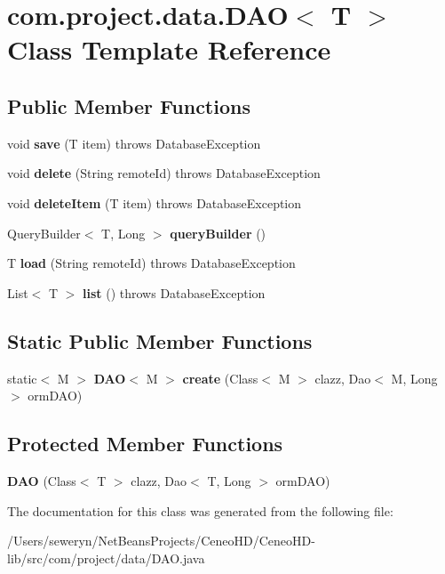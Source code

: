 \section{com.\+project.\+data.\+D\+AO$<$ T $>$ Class Template Reference}
\label{classcom_1_1project_1_1data_1_1_d_a_o}
\subsection*{Public Member Functions}
\begin{DoxyCompactItemize}
\item 
\mbox{\label{classcom_1_1project_1_1data_1_1_d_a_o_aff1d31a3d9bf4eab852e520af7682f20}} 
void {\bfseries save} (T item)  throws Database\+Exception 
\item 
\mbox{\label{classcom_1_1project_1_1data_1_1_d_a_o_a7c169df6492e909666f3c0544a2e9cc6}} 
void {\bfseries delete} (String remote\+Id)  throws Database\+Exception 
\item 
\mbox{\label{classcom_1_1project_1_1data_1_1_d_a_o_aa1ec1c6cc8b7a7126b2a6e049c9f3e17}} 
void {\bfseries delete\+Item} (T item)  throws Database\+Exception 
\item 
\mbox{\label{classcom_1_1project_1_1data_1_1_d_a_o_ae804c557084e909940631da1a77403c6}} 
Query\+Builder$<$ T, Long $>$ {\bfseries query\+Builder} ()
\item 
\mbox{\label{classcom_1_1project_1_1data_1_1_d_a_o_a30552a04b7b971e0e7666c5e4553d1be}} 
T {\bfseries load} (String remote\+Id)  throws Database\+Exception
\item 
\mbox{\label{classcom_1_1project_1_1data_1_1_d_a_o_a38741fef5f4ec613a27a4b3efe9760e4}} 
List$<$ T $>$ {\bfseries list} ()  throws Database\+Exception
\end{DoxyCompactItemize}
\subsection*{Static Public Member Functions}
\begin{DoxyCompactItemize}
\item 
\mbox{\label{classcom_1_1project_1_1data_1_1_d_a_o_a2fe12a0cce05ab5a2db64f63ca726cc7}} 
static$<$ M $>$ \textbf{ D\+AO}$<$ M $>$ {\bfseries create} (Class$<$ M $>$ clazz, Dao$<$ M, Long $>$ orm\+D\+AO)
\end{DoxyCompactItemize}
\subsection*{Protected Member Functions}
\begin{DoxyCompactItemize}
\item 
\mbox{\label{classcom_1_1project_1_1data_1_1_d_a_o_a4e4cac87ae6ac9680e35d57022b2c9db}} 
{\bfseries D\+AO} (Class$<$ T $>$ clazz, Dao$<$ T, Long $>$ orm\+D\+AO)
\end{DoxyCompactItemize}


The documentation for this class was generated from the following file\+:\begin{DoxyCompactItemize}
\item 
/\+Users/seweryn/\+Net\+Beans\+Projects/\+Ceneo\+H\+D/\+Ceneo\+H\+D-\/lib/src/com/project/data/D\+A\+O.\+java\end{DoxyCompactItemize}

